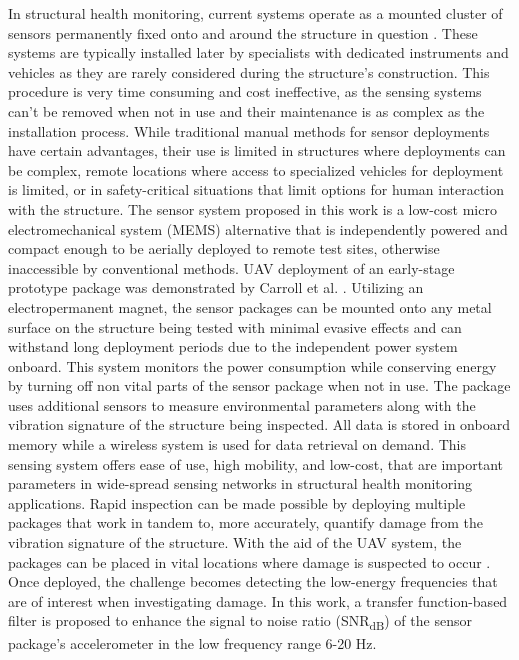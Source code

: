 \documentclass[]{spie}  %
\begin{document}
	In structural health monitoring, current systems operate as a mounted cluster of sensors permanently fixed onto and around the structure in question \cite{Pakzad2008}. These systems are typically installed later by specialists with dedicated instruments and vehicles as they are rarely considered during the structure's construction. This procedure is very time consuming and cost ineffective, as the sensing systems can’t be removed when not in use and their maintenance is as complex as the installation process. While traditional manual methods for sensor deployments have certain advantages, their use is limited in structures where deployments can be complex, remote locations where access to specialized vehicles for deployment is limited, or in safety-critical situations that limit options for human interaction with the structure. The sensor system proposed in this work is a low-cost micro electromechanical system (MEMS) alternative \cite{Sabato2017} that is independently powered and compact enough to be aerially deployed to remote test sites, otherwise inaccessible by conventional methods. UAV deployment of an early-stage prototype package was demonstrated by Carroll et al. \cite{Carroll2021}. Utilizing an electropermanent magnet, the sensor packages can be mounted onto any metal surface on the structure being tested with minimal evasive effects \cite{Takeuchi2017} and can withstand long deployment periods due to the independent power system onboard. This system monitors the power consumption while conserving energy by turning off non vital parts of the sensor package when not in use. The package uses additional sensors to measure environmental parameters along with the vibration signature of the structure being inspected. All data is stored in onboard memory while a wireless system is used for data retrieval on demand. This sensing system offers ease of use, high mobility, and low-cost, that are important parameters in wide-spread sensing networks in structural health monitoring applications. Rapid inspection can be made possible by deploying multiple packages that work in tandem to, more accurately, quantify damage from the vibration signature of the structure. With the aid of the UAV system, the packages can be placed in vital locations where damage is suspected to occur \cite{Chen2010}. Once deployed, the challenge becomes detecting the low-energy frequencies that are of interest when investigating damage. In this work, a transfer function-based filter is proposed to enhance the signal to noise ratio (SNR\textsubscript{dB}) of the sensor package’s accelerometer in the low frequency range 6-20 Hz.
	
\end{document}
